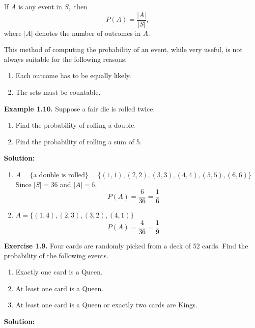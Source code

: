 \documentclass[
  12pt,
]{krantzNoCorner}
\providecommand{\tightlist}{%
  \setlength{\itemsep}{0pt}\setlength{\parskip}{0pt}}
\begin{document}
If \(A\) is any event in \(S,\) then \[P(A) = \frac{|A|}{|S|},\] where \(|A|\)
denotes the number of outcomes in \(A.\)

This method of computing the probability of an event, while very
useful, is not always suitable for the following reasons:

\begin{enumerate}
\def\labelenumi{\arabic{enumi}.}
\tightlist
\item
  Each outcome has to be equally likely.
\item
  The sets must be countable.
\end{enumerate}

\textbf{Example 1.10.} Suppose a fair die is rolled twice.

\begin{enumerate}
\def\labelenumi{\arabic{enumi}.}
\tightlist
\item
  Find the probability of rolling a double.
\item
  Find the probability of rolling a sum of 5.
\end{enumerate}

\textbf{Solution:}

\begin{enumerate}
\def\labelenumi{\arabic{enumi}.}
\item
  \(A=\{\text{a double is rolled}\}=\{(1,1),(2,2),(3,3),(4,4),(5,5),(6,6)\}\)
  Since \(|S|=36\) and \(|A|=6,\) \[P(A)=\frac{6}{36}=\frac{1}{6}\]
\item
  \(A=\{(1,4), (2,3),(3,2),(4,1)\}\) \[P(A)=\frac{4}{36}=\frac{1}{9}\]
\end{enumerate}

\textbf{Exercise 1.9.} Four cards are randomly picked from a deck of 52
cards. Find the probability of the following events.

\begin{enumerate}
\def\labelenumi{\arabic{enumi}.}
\item
  Exactly one card is a Queen.
\item
  At least one card is a Queen.
\item
  At least one card is a Queen or exactly two cards are Kings.
\end{enumerate}

\textbf{Solution:}
\end{document}

